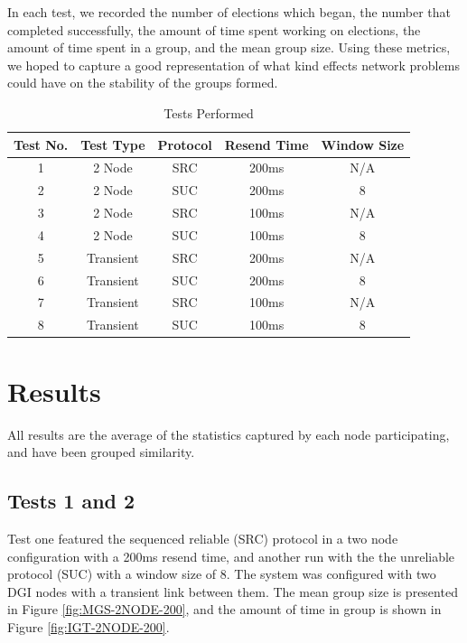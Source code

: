 \documentclass{llncs}
\begin{document}
In each test, we recorded the number of elections which began, the number that completed successfully, the amount of time spent working on elections, the amount of time spent in a group, and the mean group size. Using these metrics, we hoped to capture a good representation of what kind effects network problems could have on the stability of the groups formed.

\begin{table}[!t]
\renewcommand{\arraystretch}{1.3}
\caption{Tests Performed}
\label{TableTests}
\centering
\begin{tabular}{c c c c c}
\hline
Test No. & Test Type & Protocol & Resend Time & Window Size \\ \hline \hline
1        & 2 Node    & SRC      & 200ms       & N/A \\ \hline
2        & 2 Node    & SUC      & 200ms       & 8 \\ \hline
3        & 2 Node    & SRC      & 100ms       & N/A \\ \hline
4        & 2 Node    & SUC      & 100ms       & 8 \\ \hline
5        & Transient & SRC      & 200ms       & N/A \\ \hline
6        & Transient & SUC      & 200ms       & 8 \\ \hline
7        & Transient & SRC      & 100ms       & N/A \\ \hline
8       & Transient & SUC      & 100ms       & 8 \\ \hline
\end{tabular}
\end{table}

\section{Results}

All results are the average of the statistics captured by each node participating, and have been grouped similarity.

\subsection{Tests 1 and 2}
Test one featured the sequenced reliable (SRC) protocol in a two node configuration with a 200ms resend time, and another run with the
the unreliable protocol (SUC) with a window size of 8. The system was configured with two DGI nodes with a transient link between them.
The mean group size is presented in Figure \ref{fig:MGS-2NODE-200}, and the amount of time in group is shown in Figure \ref{fig:IGT-2NODE-200}.
\end{document}
